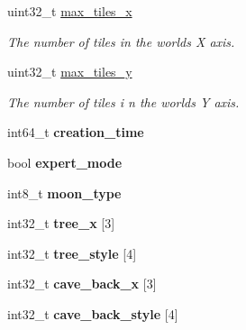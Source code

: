 \begin{DoxyCompactItemize}
\item 
\hypertarget{structworld_a1896dcfbf468780dccd7077fff5e1eef}{}uint32\+\_\+t \hyperlink{structworld_a1896dcfbf468780dccd7077fff5e1eef}{max\+\_\+tiles\+\_\+x}\label{structworld_a1896dcfbf468780dccd7077fff5e1eef}

\begin{DoxyCompactList}\small\item\em The number of tiles in the world\textquotesingle{}s X axis. \end{DoxyCompactList}\item 
\hypertarget{structworld_a824fe6eb1899c94a0f92db0f776a3350}{}uint32\+\_\+t \hyperlink{structworld_a824fe6eb1899c94a0f92db0f776a3350}{max\+\_\+tiles\+\_\+y}\label{structworld_a824fe6eb1899c94a0f92db0f776a3350}

\begin{DoxyCompactList}\small\item\em The number of tiles i n the world\textquotesingle{}s Y axis. \end{DoxyCompactList}\item 
\hypertarget{structworld_ad10e07a1cfc4c6266195667044a963a5}{}int64\+\_\+t {\bfseries creation\+\_\+time}\label{structworld_ad10e07a1cfc4c6266195667044a963a5}

\item 
\hypertarget{structworld_a377ea76a936658d3153a8148ba49cca8}{}bool {\bfseries expert\+\_\+mode}\label{structworld_a377ea76a936658d3153a8148ba49cca8}

\item 
\hypertarget{structworld_a29bae7f69ccd5d0b3d07267cafc0ae28}{}int8\+\_\+t {\bfseries moon\+\_\+type}\label{structworld_a29bae7f69ccd5d0b3d07267cafc0ae28}

\item 
\hypertarget{structworld_a2fa754354b964002dc89aca38c63bcd2}{}int32\+\_\+t {\bfseries tree\+\_\+x} \mbox{[}3\mbox{]}\label{structworld_a2fa754354b964002dc89aca38c63bcd2}

\item 
\hypertarget{structworld_a904c94a7cf276ea09f9ac5c3f420e241}{}int32\+\_\+t {\bfseries tree\+\_\+style} \mbox{[}4\mbox{]}\label{structworld_a904c94a7cf276ea09f9ac5c3f420e241}

\item 
\hypertarget{structworld_acb29b0a3f8e5c19d097356c8f69e6d15}{}int32\+\_\+t {\bfseries cave\+\_\+back\+\_\+x} \mbox{[}3\mbox{]}\label{structworld_acb29b0a3f8e5c19d097356c8f69e6d15}

\item 
\hypertarget{structworld_a916d83825cc1f9817a6ae47f1d1ec43c}{}int32\+\_\+t {\bfseries cave\+\_\+back\+\_\+style} \mbox{[}4\mbox{]}\label{structworld_a916d83825cc1f9817a6ae47f1d1ec43c}


\end{DoxyCompactItemize}
